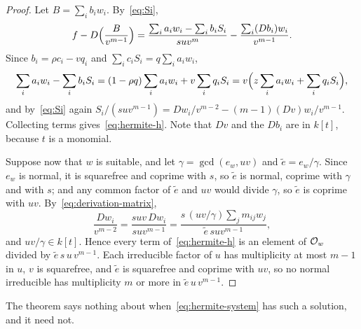 \begin{proof}
Let $B = \sum_i b_i w_i$. By~\eqref{eq:Si},
\[
  f - D\Bigl(\frac{B}{v^{m-1}}\Bigr)
  = \frac{\sum_i a_i w_i - \sum_i b_i S_i}{s u v^m}
    - \frac{\sum_i (Db_i) w_i}{v^{m-1}} .
\]
Since $b_i = \rho c_i - v q_i$ and $\sum_i c_i S_i = q \sum_i a_i w_i$,
\[
  \sum_i a_i w_i - \sum_i b_i S_i
  = (1 - \rho q) \sum_i a_i w_i + v \sum_i q_i S_i
  = v \Bigl( z \sum_i a_i w_i + \sum_i q_i S_i \Bigr),
\]
and by~\eqref{eq:Si} again $S_i / (s u v^{m-1}) = Dw_i / v^{m-2} - (m-1) (Dv)
w_i / v^{m-1}$. Collecting terms gives~\eqref{eq:hermite-h}. Note that $Dv$
and the $Db_i$ are in $k[t]$, because $t$ is a monomial.

Suppose now that $w$ is suitable, and let $\gamma = \gcd(e_w, uv)$ and $\tilde e =
e_w / \gamma$. Since $e_w$ is normal, it is squarefree and coprime with $s$,
so $\tilde e$ is normal, coprime with $\gamma$ and with $s$; and any common factor of
$\tilde e$ and $uv$ would divide $\gamma$, so $\tilde e$ is coprime with $uv$.
By~\eqref{eq:derivation-matrix},
\[
  \frac{Dw_i}{v^{m-2}} = \frac{s u v\, Dw_i}{s u v^{m-1}}
  = \frac{s\,(uv/\gamma) \sum_j m_{ij} w_j}{\tilde e\, s u v^{m-1}} ,
\]
and $uv/\gamma \in k[t]$. Hence every term of~\eqref{eq:hermite-h} is an
element of $\mathcal{O}_w$ divided by $\tilde e\,s\,u\,v^{m-1}$. Each irreducible factor of
$u$ has multiplicity at most $m - 1$ in $u$, $v$ is squarefree, and $\tilde e$ is
squarefree and coprime with $uv$, so no normal irreducible has multiplicity
$m$ or more in $\tilde e\,u\,v^{m-1}$.
\end{proof}

The theorem says nothing about when~\eqref{eq:hermite-system} has such a
solution, and it need not.

